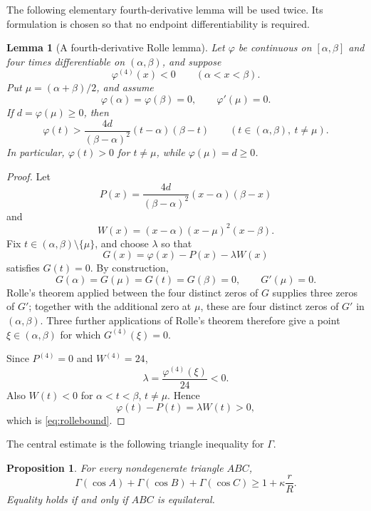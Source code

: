 \documentclass[11pt]{article}
\newtheorem{lemma}[theorem]{Lemma}
\newtheorem{proposition}[theorem]{Proposition}
\theoremstyle{definition}
\theoremstyle{remark}
\begin{document}
The following elementary fourth-derivative lemma will be used twice.  Its formulation is chosen so that no endpoint differentiability is required.

\begin{lemma}[A fourth-derivative Rolle lemma]
\label{lem:rolle4}
Let $\varphi$ be continuous on $[\alpha,\beta]$ and four times differentiable on $(\alpha,\beta)$, and suppose
\[
\varphi^{(4)}(x)<0
\qquad(\alpha<x<\beta).
\]
Put $\mu=(\alpha+\beta)/2$, and assume
\[
\varphi(\alpha)=\varphi(\beta)=0,
\qquad
\varphi'(\mu)=0.
\]
If $d=\varphi(\mu)\ge0$, then
\begin{equation}
\label{eq:rollebound}
\varphi(t)>
\frac{4d}{(\beta-\alpha)^2}(t-\alpha)(\beta-t)
\qquad
(t\in(\alpha,\beta),\ t\ne\mu).
\end{equation}
In particular, $\varphi(t)>0$ for $t\ne\mu$, while $\varphi(\mu)=d\ge0$.
\end{lemma}

\begin{proof}
Let
\[
P(x)=\frac{4d}{(\beta-\alpha)^2}(x-\alpha)(\beta-x)
\]
and
\[
W(x)=(x-\alpha)(x-\mu)^2(x-\beta).
\]
Fix $t\in(\alpha,\beta)\setminus\{\mu\}$, and choose $\lambda$ so that
\[
G(x)=\varphi(x)-P(x)-\lambda W(x)
\]
satisfies $G(t)=0$.  By construction,
\[
G(\alpha)=G(\mu)=G(t)=G(\beta)=0,
\qquad
G'(\mu)=0.
\]
Rolle's theorem applied between the four distinct zeros of $G$ supplies three zeros of $G'$; together with the additional zero at $\mu$, these are four distinct zeros of $G'$ in $(\alpha,\beta)$.  Three further applications of Rolle's theorem therefore give a point $\xi\in(\alpha,\beta)$ for which $G^{(4)}(\xi)=0$.

Since $P^{(4)}=0$ and $W^{(4)}=24$,
\[
\lambda=\frac{\varphi^{(4)}(\xi)}{24}<0.
\]
Also $W(t)<0$ for $\alpha<t<\beta$, $t\ne\mu$.  Hence
\[
\varphi(t)-P(t)=\lambda W(t)>0,
\]
which is \eqref{eq:rollebound}.
\end{proof}

The central estimate is the following triangle inequality for $\Gamma$.

\begin{proposition}
\label{prop:Gammaineq}
For every nondegenerate triangle $ABC$,
\begin{equation}
\label{eq:Gammaineq}
\Gamma(\cos A)+\Gamma(\cos B)+\Gamma(\cos C)
\ge
1+\kappa\frac rR.
\end{equation}
Equality holds if and only if $ABC$ is equilateral.
\end{proposition}
\end{document}
